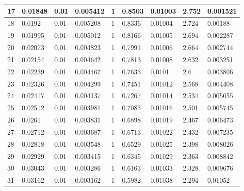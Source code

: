 \begin{table}[h!]
\begin{tabular}{|l|l|l|l|l|l|l|l|l|}
		17 & 0.01848  & 0.01     & 0.005412 & 1               & 0.8503 & 0.01003 & 2.752 & 0.001521  \\ \hline
		18 & 0.0192   & 0.01     & 0.005208 & 1               & 0.8336 & 0.01004 & 2.724 & 0.00188   \\ \hline
		19 & 0.01995  & 0.01     & 0.005012 & 1               & 0.8166 & 0.01005 & 2.694 & 0.002287  \\ \hline
		20 & 0.02073  & 0.01     & 0.004823 & 1               & 0.7991 & 0.01006 & 2.664 & 0.002744  \\ \hline
		21 & 0.02154  & 0.01     & 0.004642 & 1               & 0.7813 & 0.01008 & 2.632 & 0.003251  \\ \hline
		22 & 0.02239  & 0.01     & 0.004467 & 1               & 0.7633 & 0.0101  & 2.6   & 0.003806  \\ \hline
		23 & 0.02326  & 0.01     & 0.004299 & 1               & 0.7451 & 0.01012 & 2.568 & 0.004408  \\ \hline
		24 & 0.02417  & 0.01     & 0.004137 & 1               & 0.7267 & 0.01014 & 2.534 & 0.005055  \\ \hline
		25 & 0.02512  & 0.01     & 0.003981 & 1               & 0.7083 & 0.01016 & 2.501 & 0.005745  \\ \hline
		26 & 0.0261   & 0.01     & 0.003831 & 1               & 0.6898 & 0.01019 & 2.467 & 0.006473  \\ \hline
		27 & 0.02712  & 0.01     & 0.003687 & 1               & 0.6713 & 0.01022 & 2.432 & 0.007235  \\ \hline
		28 & 0.02818  & 0.01     & 0.003548 & 1               & 0.6529 & 0.01025 & 2.398 & 0.008026  \\ \hline
		29 & 0.02929  & 0.01     & 0.003415 & 1               & 0.6345 & 0.01029 & 2.363 & 0.008842  \\ \hline
		30 & 0.03043  & 0.01     & 0.003286 & 1               & 0.6163 & 0.01033 & 2.328 & 0.009676  \\ \hline
		31 & 0.03162  & 0.01     & 0.003162 & 1               & 0.5982 & 0.01038 & 2.294 & 0.01052   \\ \hline
	\end{tabular}
	\label{table:results}
\end{table}